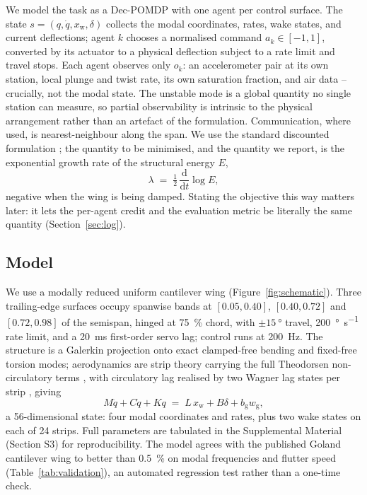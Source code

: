 \documentclass[preprint,11pt]{elsarticle}
\begin{document}
We model the task as a Dec-POMDP
\cite{bernstein2002complexity,oliehoek2016concise} with one agent per
control surface. The state $s=(q,\dot q,x_{\mathrm{w}},\delta)$ collects the
modal coordinates, rates, wake states, and current deflections; agent $k$
chooses a normalised command $a_k\in[-1,1]$, converted by its actuator to a
physical deflection subject to a rate limit and travel stops. Each agent
observes only $o_k$: an accelerometer pair at its own station, local plunge
and twist rate, its own saturation fraction, and air data -- crucially, not
the modal state. The unstable mode is a global quantity no single station
can measure, so partial observability is intrinsic to the physical
arrangement rather than an artefact of the formulation. Communication,
where used, is nearest-neighbour along the span. We use the standard
discounted formulation \cite{sutton2018reinforcement}; the quantity to be
minimised, and the quantity we report, is the exponential growth rate of
the structural energy $E$,
\begin{equation}
\lambda \;=\; \tfrac{1}{2}\,\frac{\mathrm{d}}{\mathrm{d}t}\log E ,
\label{eq:objective}
\end{equation}
negative when the wing is being damped. Stating the objective this way
matters later: it lets the per-agent credit and the evaluation metric be
literally the same quantity (Section~\ref{sec:log}).

\subsection{Model}
\label{sec:plant}

We use a modally reduced uniform cantilever wing (Figure~\ref{fig:schematic}).
Three trailing-edge surfaces occupy spanwise bands at
$[0.05,0.40]$, $[0.40,0.72]$ and $[0.72,0.98]$ of the semispan, hinged at
\SI{75}{\percent} chord, with $\pm\SI{15}{\degree}$ travel,
\SI{200}{\degree\per\second} rate limit, and a \SI{20}{\milli\second}
first-order servo lag; control runs at \SI{200}{\hertz}. The structure is a
Galerkin projection onto exact clamped-free bending and fixed-free torsion
modes; aerodynamics are strip theory carrying the full Theodorsen
non-circulatory terms \cite{theodorsen1935}, with circulatory lag realised
by two Wagner lag states per strip \cite{jones1940}, giving
\begin{equation}
M \ddot q + C \dot q + K q \;=\; L\, x_{\mathrm{w}} + B \delta
+ b_{\mathrm{g}} w_{\mathrm{g}} ,
\label{eq:eom}
\end{equation}
a 56-dimensional state: four modal coordinates and rates, plus two wake
states on each of 24 strips. Full parameters are tabulated in the
Supplemental Material (Section S3) for reproducibility. The model agrees
with the published Goland cantilever wing \cite{goland1945} to better than
\SI{0.5}{\percent} on modal frequencies and flutter speed
(Table~\ref{tab:validation}), an automated regression test rather than a
one-time check.
\end{document}
